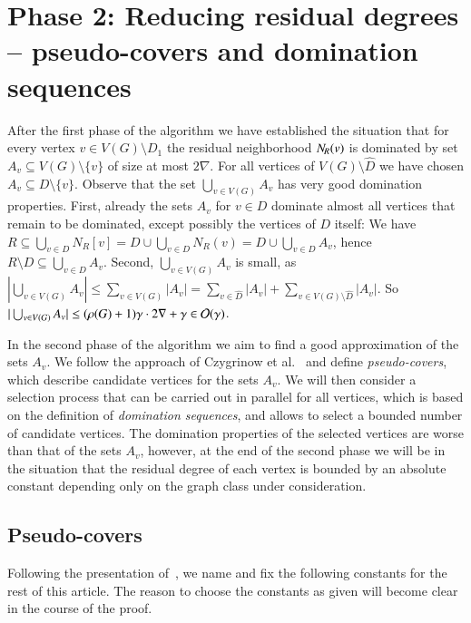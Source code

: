 
\section{Phase 2: Reducing residual degrees -- pseudo-covers and domination sequences}\label{sec:phase2}

After the first phase of the algorithm we have established the situation
that for every vertex \mbox{$v\in V(G)\setminus D_1$} the residual neighborhood
$N_{\hspace{-1pt}R}(v)$ is dominated by set $A_v\subseteq V(G)\setminus\{v\}$
of size at most $2\nabla$.  For all vertices of
$V(G)\setminus \hat{D}$ we have chosen $A_v\subseteq D\setminus\{v\}$.
Observe that the set $\bigcup_{v\in V(G)}A_v$ has very good
domination properties. First, already the sets $A_v$ for $v\in D$
dominate almost all vertices that remain to be dominated, except possibly
the vertices of $D$ itself: We have $R\subseteq \bigcup_{v\in D} N_R[v]
= D\cup \bigcup_{v\in D} N_R(v)=D\cup \bigcup_{v\in D} A_v$, hence
$R\setminus D\subseteq \bigcup_{v\in D}A_v$.
Second, $\bigcup_{v\in V(G)}A_v$ is small, as
$|\bigcup_{v\in V(G)}A_v|\leq
\sum_{v\in V(G)} |A_v|
=\sum_{v\in \hat{D}}|A_v|+ \sum_{v\in V(G)\setminus\hat{D}}|A_v|$.
So~$|\bigcup_{v\in V(G)}A_v|
\leq (\rho(G)+1)\gamma\cdot 2\nabla+\gamma
\in \mathcal{O}(\gamma)$.

\pagebreak
In the second phase of
the algorithm we aim to find a good approximation of the sets $A_v$.
We follow the approach of Czygrinow et al.~\cite{czygrinow2018distributed}
and define \emph{pseudo-covers}, which describe candidate
vertices for the sets $A_v$. We will then consider a selection process that
can be carried out in parallel for all vertices, which is based on the
definition of \emph{domination sequences}, and allows to select
a bounded number of candidate vertices. The domination properties
of the selected vertices are worse than that of the sets $A_v$, however,
at the end of the second phase we will be in the situation that the
residual degree of each vertex is bounded by an absolute constant
depending only on the graph class under consideration.\vspace{-2mm}

\subsection{Pseudo-covers}

Following the presentation of~\cite{czygrinow2018distributed}, we name and fix
the following constants for the rest of this article. The reason to choose
the constants as given will become clear in the course of the proof.

